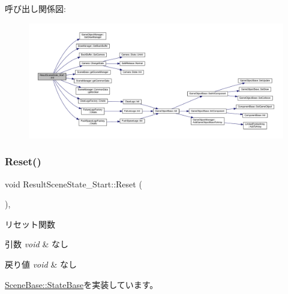 呼び出し関係図\+:
\nopagebreak
\begin{figure}[H]
\begin{center}
\leavevmode
\includegraphics[width=350pt]{class_result_scene_state___start_a615c7e05efd2320b8956c5fd94398f55_cgraph}
\end{center}
\end{figure}
\mbox{\label{class_result_scene_state___start_a8f776a7b2d31451c434fb74ffdd65960}} 
\subsubsection{\texorpdfstring{Reset()}{Reset()}}
{\footnotesize\ttfamily void Result\+Scene\+State\+\_\+\+Start\+::\+Reset (\begin{DoxyParamCaption}{ }\end{DoxyParamCaption})\hspace{0.3cm}{\ttfamily [override]}, {\ttfamily [virtual]}}



リセット関数 


\begin{DoxyParams}{引数}
{\em void} & なし \\
\hline
\end{DoxyParams}

\begin{DoxyRetVals}{戻り値}
{\em void} & なし \\
\hline
\end{DoxyRetVals}


\mbox{\hyperlink{class_scene_base_1_1_state_base_a2e14a3afece0b1d8db9edcebf514a977}{Scene\+Base\+::\+State\+Base}}を実装しています。




